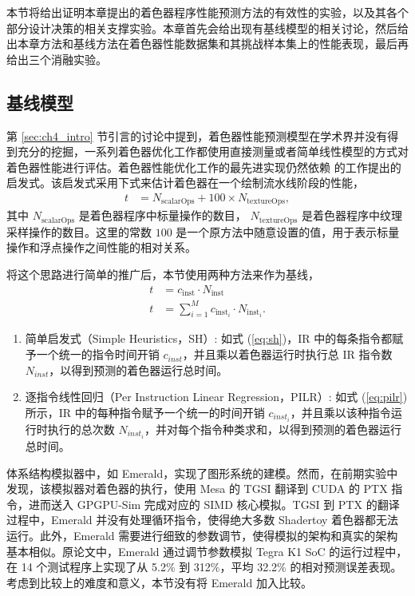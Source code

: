 {\amend 本节将给出证明本章提出的着色器程序性能预测方法的有效性的实验，以及其各个部分设计决策的相关支撑实验。本章首先会给出现有基线模型的相关讨论，然后给出本章方法和基线方法在着色器性能数据集和其挑战样本集上的性能表现，最后再给出三个消融实验。}

\subsection{基线模型}

{\amend 第 \ref{sec:ch4_intro} 节引言的讨论中提到，着色器性能预测模型在学术界并没有得到充分的挖掘，一系列着色器优化工作都使用直接测量或者简单线性模型的方式对着色器性能进行评估。着色器性能优化工作的最先进实现仍然依赖 \citet{10.1145/2816795.2818104} 的工作提出的启发式。}该启发式采用下式来估计着色器在一个绘制流水线阶段的性能，
\begin{align}
t &= N_\text{scalarOps} + 100 \times N_\text{textureOps},
\end{align}
其中 $N_\text{scalarOps}$ 是着色器程序中标量操作的数目， $N_\text{textureOps}$ 是着色器程序中纹理采样操作的数目。这里的常数 $100$ 是一个原方法中随意设置的值，用于表示标量操作和浮点操作之间性能的相对关系。

将这个思路进行简单的推广后，{\amend 本节}使用两种方法来作为基线，
\begin{align}
\label{eq:sh} t &= c_\text{inst} \cdot N_\text{inst} \\
\label{eq:pilr} t &= \sum_{i=1}^{M} c_{\text{inst}_{i}} \cdot N_{\text{inst}_{i}}.
\end{align}

\begin{enumerate}
    \item 简单启发式（Simple Heuristics，SH）: 如式 (\ref{eq:sh})，IR 中的每条指令都赋予一个统一的指令时间开销 $c_{inst}$，并且乘以着色器运行时执行总 IR 指令数 $N_{inst}$，以得到预测的着色器运行总时间。
    \item 逐指令线性回归（Per Instruction Linear Regression，PILR）: 如式 (\ref{eq:pilr}) 所示，IR 中的每种指令赋予一个统一的时间开销 $c_{inst_i}$，并且乘以该种指令运行时执行的总次数 $N_{inst_i}$，并对每个指令种类求和，以得到预测的着色器运行总时间。
\end{enumerate}

{\amend 体系结构模拟器中，如 Emerald\cite{10.1145/3307650.3322221}，实现了图形系统的建模。然而，在前期实验中发现，该模拟器对着色器的执行，使用 Mesa 的 TGSI \cite{TGSI} 翻译到 CUDA 的 PTX 指令，进而送入 GPGPU-Sim 完成对应的 SIMD 核心模拟。TGSI 到 PTX 的翻译过程中，Emerald 并没有处理循环指令，使得绝大多数 Shadertoy 着色器都无法运行。此外，Emerald 需要进行细致的参数调节，使得模拟的架构和真实的架构基本相似。原论文中，Emerald 通过调节参数模拟 Tegra K1 SoC 的运行过程中，在 14 个测试程序上实现了从 5.2\% 到 312\%，平均 32.2\% 的相对预测误差表现。考虑到比较上的难度和意义，本节没有将 Emerald 加入比较。}

